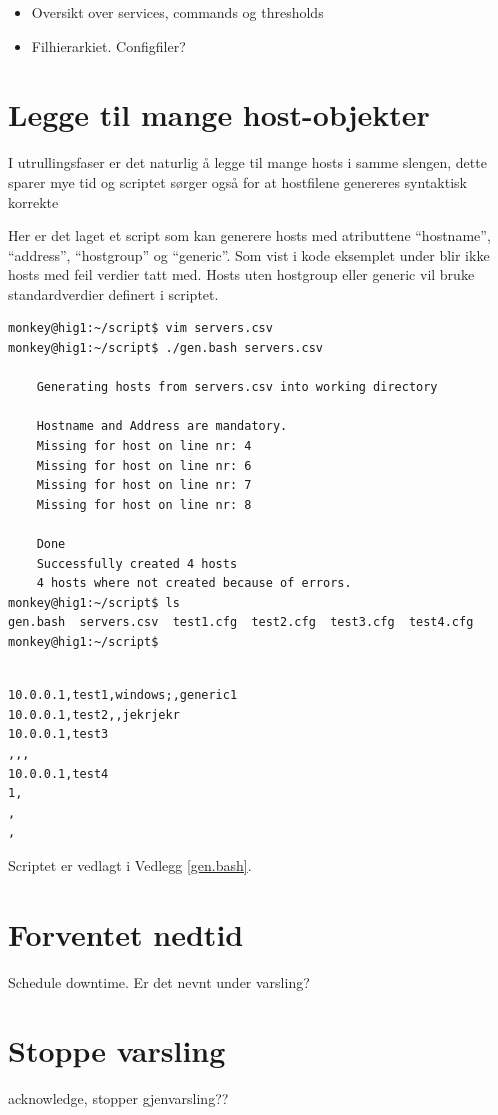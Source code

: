 \begin{itemize}
        \item Oversikt over services, commands og thresholds
        \item Filhierarkiet. Configfiler?
\end{itemize}
\section{Legge til mange host-objekter}
I utrullingsfaser er det naturlig å legge til mange hosts i samme slengen, dette sparer mye tid og scriptet sørger også for at hostfilene genereres syntaktisk korrekte

Her er det laget et script som kan generere hosts med atributtene  ``hostname'', ``address'', ``hostgroup'' og ``generic''. Som vist i kode eksemplet under blir ikke hosts med feil verdier tatt med. Hosts uten hostgroup eller generic vil bruke standardverdier definert i scriptet.



\begin{lstlisting}
monkey@hig1:~/script$ vim servers.csv
monkey@hig1:~/script$ ./gen.bash servers.csv

	Generating hosts from servers.csv into working directory

	Hostname and Address are mandatory.
	Missing for host on line nr: 4
	Missing for host on line nr: 6
	Missing for host on line nr: 7
	Missing for host on line nr: 8

	Done
	Successfully created 4 hosts
	4 hosts where not created because of errors.
monkey@hig1:~/script$ ls
gen.bash  servers.csv  test1.cfg  test2.cfg  test3.cfg  test4.cfg
monkey@hig1:~/script$
\end{lstlisting}

\begin{lstlisting}

10.0.0.1,test1,windows;,generic1
10.0.0.1,test2,,jekrjekr
10.0.0.1,test3
,,,
10.0.0.1,test4
1,
,
,
\end{lstlisting}

Scriptet er vedlagt i Vedlegg \ref{gen.bash}.

\section{Forventet nedtid}
Schedule downtime. Er det nevnt under varsling?
\section{Stoppe varsling}
acknowledge, stopper gjenvarsling??
